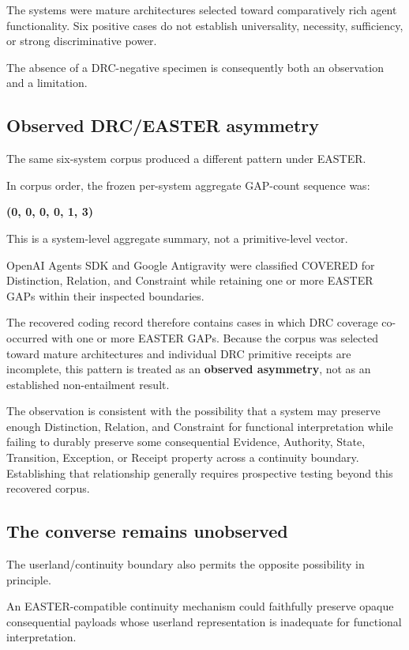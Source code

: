 \documentclass[11pt]{article}
\begin{document}
The systems were mature architectures selected toward comparatively rich agent functionality. Six positive cases do not establish universality, necessity, sufficiency, or strong discriminative power.

The absence of a DRC-negative specimen is consequently both an observation and a limitation.

\subsection{Observed DRC/EASTER asymmetry}

The same six-system corpus produced a different pattern under EASTER.

In corpus order, the frozen per-system aggregate GAP-count sequence was:

\textbf{(0, 0, 0, 0, 1, 3)}

This is a system-level aggregate summary, not a primitive-level vector.

OpenAI Agents SDK and Google Antigravity were classified COVERED for Distinction, Relation, and Constraint while retaining one or more EASTER GAPs within their inspected boundaries.

The recovered coding record therefore contains cases in which DRC coverage co-occurred with one or more EASTER GAPs. Because the corpus was selected toward mature architectures and individual DRC primitive receipts are incomplete, this pattern is treated as an \textbf{observed asymmetry}, not as an established non-entailment result.

The observation is consistent with the possibility that a system may preserve enough Distinction, Relation, and Constraint for functional interpretation while failing to durably preserve some consequential Evidence, Authority, State, Transition, Exception, or Receipt property across a continuity boundary. Establishing that relationship generally requires prospective testing beyond this recovered corpus.

\subsection{The converse remains unobserved}

The userland/continuity boundary also permits the opposite possibility in principle.

An EASTER-compatible continuity mechanism could faithfully preserve opaque consequential payloads whose userland representation is inadequate for functional interpretation.
\end{document}
